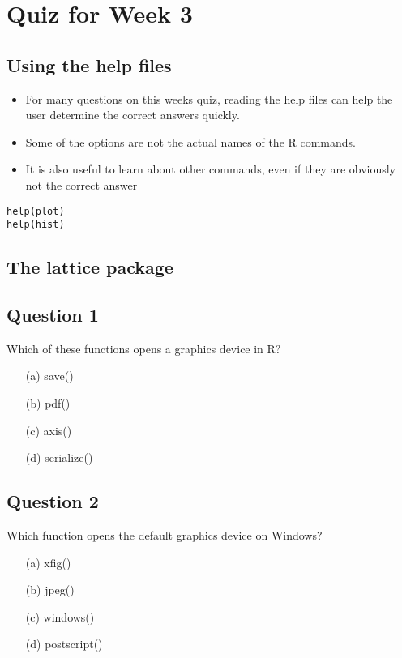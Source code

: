 \documentclass[12pt]{article}
\begin{document}
\section{Quiz for Week 3}

\subsection*{Using the help files}

\begin{itemize}
\item For many questions on this weeks quiz, reading the help files can help the user
determine the correct answers quickly.

\item Some of the options are not the actual names of the R commands.

\item It is also useful to learn about other commands, even if they are obviously not the correct answer
\end{itemize}
\begin{framed}
\begin{verbatim}
help(plot)
help(hist)
\end{verbatim}
\end{framed}
\subsection*{The lattice package}

\newpage
\subsection*{Question 1}
Which of these functions opens a graphics device in R?
\begin{itemize}
\item[(a)] save()
\item[(b)] pdf()
\item[(c)] axis()
\item[(d)] serialize()
\end{itemize}
\subsection*{Question 2}
Which function opens the default graphics device on Windows?
\begin{itemize}
\item[(a)] xfig()
\item[(b)] jpeg()
\item[(c)] windows()
\item[(d)] postscript()
\end{itemize}
\end{document}
